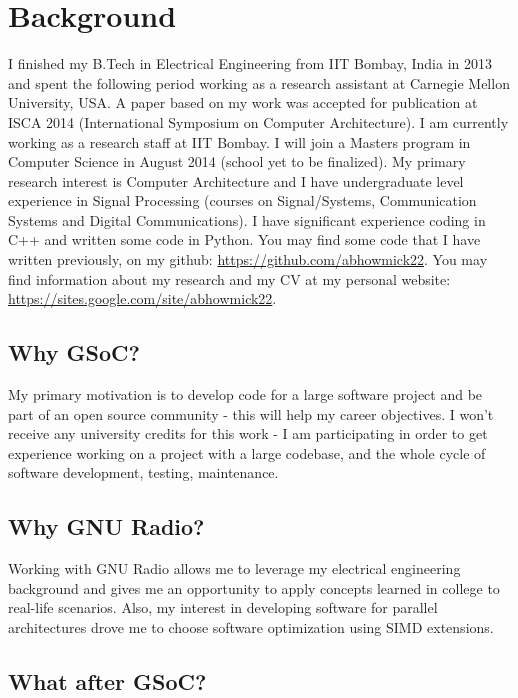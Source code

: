 \documentclass[a4paper,12pt,oneside]{article}
\begin{document}
\section{Background}
I finished my B.Tech in Electrical Engineering from IIT Bombay, India in 2013 and spent the following period working as a research assistant at Carnegie Mellon University, USA. A paper based on my work was accepted for publication at ISCA 2014 (International Symposium on Computer Architecture). I am currently working as a research staff at IIT Bombay. I will join a Masters program in Computer Science in August 2014 (school yet to be finalized). My primary research interest is Computer Architecture and I have undergraduate level experience in Signal Processing (courses on Signal/Systems, Communication Systems and Digital Communications). I have significant experience coding in C++ and written some code in Python. You may find some code that I have written previously, on my github: \url{https://github.com/abhowmick22}. You may find information about my research and my CV at my personal website: \url{https://sites.google.com/site/abhowmick22}.  

\subsection{Why GSoC?}

My primary motivation is to develop code for a large software project and be part of an open source community - this will help my career objectives. I won't receive any university credits for this work - I am participating in order to get experience working on a project with a large codebase, and the whole cycle of software development, testing, maintenance. 

\subsection{Why GNU Radio?}

Working with GNU Radio allows me to leverage my electrical engineering background and gives me an opportunity to apply concepts learned in college to real-life scenarios. Also, my interest in developing software for parallel architectures drove me to choose software optimization using SIMD extensions.

\subsection{What after GSoC?}
\end{document}
